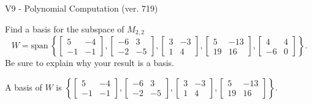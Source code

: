 \begin{exercise}
  \begin{exerciseTitle}V9 - Polynomial Computation (ver. 719)\end{exerciseTitle}
  \begin{exerciseStatement}
    Find a basis for the subspace of \(M_{2,2}\) 
\[W=\mathrm{span}\ \left\{\left[\begin{array}{cc}
5 & -4 \\
-1 & -1
\end{array}\right] , \left[\begin{array}{cc}
-6 & 3 \\
-2 & -5
\end{array}\right] , \left[\begin{array}{cc}
3 & -3 \\
1 & 4
\end{array}\right] , \left[\begin{array}{cc}
5 & -13 \\
19 & 16
\end{array}\right] , \left[\begin{array}{cc}
4 & 4 \\
-6 & 0
\end{array}\right]\right\}.\]
 Be sure to explain why your result is a basis.


  \end{exerciseStatement}
  \begin{exerciseAnswer}
   A basis of \(W\) is  \(\left\{\left[\begin{array}{cc}
5 & -4 \\
-1 & -1
\end{array}\right] , \left[\begin{array}{cc}
-6 & 3 \\
-2 & -5
\end{array}\right] , \left[\begin{array}{cc}
3 & -3 \\
1 & 4
\end{array}\right] , \left[\begin{array}{cc}
5 & -13 \\
19 & 16
\end{array}\right]\right\}\).
  


  \end{exerciseAnswer}
\end{exercise}